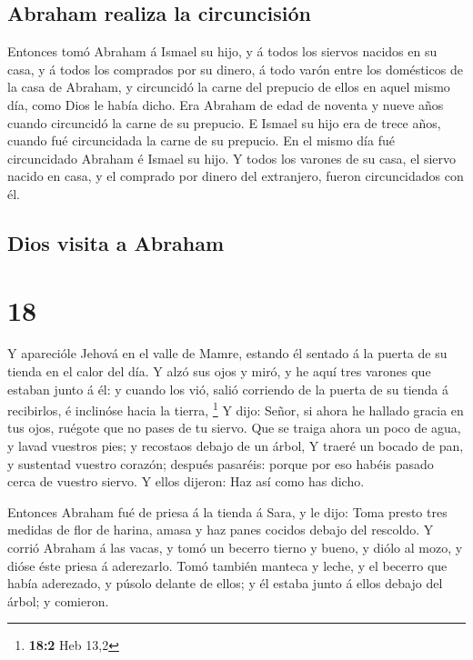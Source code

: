 \hypertarget{abraham-realiza-la-circuncisiuxf3n}{%
\subsection{Abraham realiza la
circuncisión}\label{abraham-realiza-la-circuncisiuxf3n}}

 Entonces tomó Abraham á Ismael su hijo, y á todos los
siervos nacidos en su casa, y á todos los comprados por su dinero, á
todo varón entre los domésticos de la casa de Abraham, y circuncidó la
carne del prepucio de ellos en aquel mismo día, como Dios le había
dicho.  Era Abraham de edad de noventa y nueve años cuando
circuncidó la carne de su prepucio.  E Ismael su hijo era
de trece años, cuando fué circuncidada la carne de su prepucio.
 En el mismo día fué circuncidado Abraham é Ismael su hijo.
 Y todos los varones de su casa, el siervo nacido en casa,
y el comprado por dinero del extranjero, fueron circuncidados con él.

\hypertarget{dios-visita-a-abraham}{%
\subsection{Dios visita a Abraham}\label{dios-visita-a-abraham}}

\hypertarget{section-17}{%
\section{18}\label{section-17}}

 Y aparecióle Jehová en el valle de Mamre, estando él
sentado á la puerta de su tienda en el calor del día.  Y
alzó sus ojos y miró, y he aquí tres varones que estaban junto á él: y
cuando los vió, salió corriendo de la puerta de su tienda á recibirlos,
é inclinóse hacia la tierra, \footnote{\textbf{18:2} Heb 13,2}
 Y dijo: Señor, si ahora he hallado gracia en tus ojos,
ruégote que no pases de tu siervo.  Que se traiga ahora un
poco de agua, y lavad vuestros pies; y recostaos debajo de un árbol,
 Y traeré un bocado de pan, y sustentad vuestro corazón;
después pasaréis: porque por eso habéis pasado cerca de vuestro siervo.
Y ellos dijeron: Haz así como has dicho.

 Entonces Abraham fué de priesa á la tienda á Sara, y le
dijo: Toma presto tres medidas de flor de harina, amasa y haz panes
cocidos debajo del rescoldo.  Y corrió Abraham á las vacas,
y tomó un becerro tierno y bueno, y diólo al mozo, y dióse éste priesa á
aderezarlo.  Tomó también manteca y leche, y el becerro que
había aderezado, y púsolo delante de ellos; y él estaba junto á ellos
debajo del árbol; y comieron.

